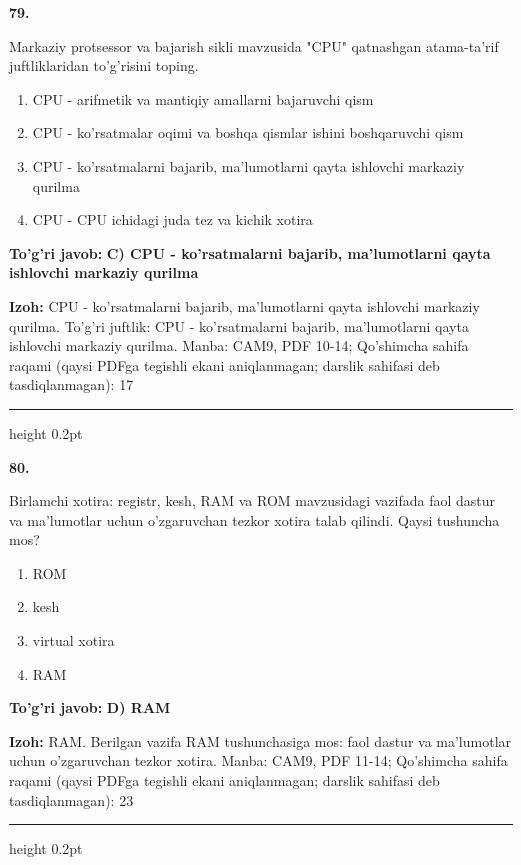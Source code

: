 \documentclass[10pt,a4paper]{article}
\begin{document}
{\bfseries\sffamily\color{ink} 79.}
\par
Markaziy protsessor va bajarish sikli mavzusida "CPU" qatnashgan atama-ta'rif juftliklaridan to'g'risini toping.
\begin{enumerate}[label=\Alph*),leftmargin=9mm]
\item CPU - arifmetik va mantiqiy amallarni bajaruvchi qism
\item CPU - ko'rsatmalar oqimi va boshqa qismlar ishini boshqaruvchi qism
\item CPU - ko'rsatmalarni bajarib, ma'lumotlarni qayta ishlovchi markaziy qurilma
\item CPU - CPU ichidagi juda tez va kichik xotira
\end{enumerate}
\begin{tcolorbox}[enhanced,breakable,colback=teal!4,colframe=teal!60!black,boxrule=0.45pt,arc=1.2mm,left=2.7mm,right=2.7mm,top=1.8mm,bottom=1.8mm,before skip=2mm,after skip=2mm]
{\bfseries\sffamily\color{teal}To'g'ri javob:} \textbf{C) CPU - ko'rsatmalarni bajarib, ma'lumotlarni qayta ishlovchi markaziy qurilma}
\par\smallskip
{\bfseries Izoh:} CPU - ko'rsatmalarni bajarib, ma'lumotlarni qayta ishlovchi markaziy qurilma. To'g'ri juftlik: CPU - ko'rsatmalarni bajarib, ma'lumotlarni qayta ishlovchi markaziy qurilma. Manba: CAM9, PDF 10-14; Qo'shimcha sahifa raqami (qaysi PDFga tegishli ekani aniqlanmagan; darslik sahifasi deb tasdiqlanmagan): 17
\end{tcolorbox}
\vspace{2mm}\hrule height 0.2pt\vspace{3mm}

{\bfseries\sffamily\color{ink} 80.}
\par
Birlamchi xotira: registr, kesh, RAM va ROM mavzusidagi vazifada faol dastur va ma'lumotlar uchun o'zgaruvchan tezkor xotira talab qilindi. Qaysi tushuncha mos?
\begin{enumerate}[label=\Alph*),leftmargin=9mm]
\item ROM
\item kesh
\item virtual xotira
\item RAM
\end{enumerate}
\begin{tcolorbox}[enhanced,breakable,colback=teal!4,colframe=teal!60!black,boxrule=0.45pt,arc=1.2mm,left=2.7mm,right=2.7mm,top=1.8mm,bottom=1.8mm,before skip=2mm,after skip=2mm]
{\bfseries\sffamily\color{teal}To'g'ri javob:} \textbf{D) RAM}
\par\smallskip
{\bfseries Izoh:} RAM. Berilgan vazifa RAM tushunchasiga mos: faol dastur va ma'lumotlar uchun o'zgaruvchan tezkor xotira. Manba: CAM9, PDF 11-14; Qo'shimcha sahifa raqami (qaysi PDFga tegishli ekani aniqlanmagan; darslik sahifasi deb tasdiqlanmagan): 23
\end{tcolorbox}
\vspace{2mm}\hrule height 0.2pt\vspace{3mm}
\end{document}
